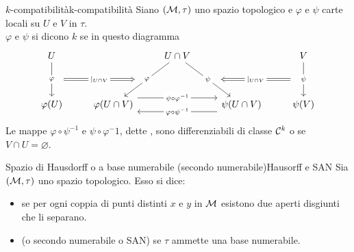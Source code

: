 \documentclass[annatarbolditalic, openany]{book}
\begin{document}
\begin{definition}{$k$-compatibilità}{k-compatibilità}
    Siano $(\mathcal{M},\tau)$ uno spazio topologico e $\varphi$ e $\psi$ carte locali su $U$ e $V$ in $\tau$.\\
    $\varphi$ e $\psi$ si dicono $k$ se in questo diagramma
    \[\begin{tikzcd}
	    U && {U\cap V} && V \\
	    \\
	    {\varphi(U)} & {\varphi(U \cap V)} && {\psi(U\cap V)} & {\psi(V)}
	    \arrow[""{name=0, anchor=center, inner sep=0}, "\varphi"{description}, from=1-1, to=3-1]
	    \arrow[""{name=1, anchor=center, inner sep=0}, "\varphi"{description}, from=1-3, to=3-2]
	    \arrow[""{name=2, anchor=center, inner sep=0}, "\psi"{description}, from=1-3, to=3-4]
	    \arrow[""{name=3, anchor=center, inner sep=0}, "\psi"{description}, from=1-5, to=3-5]
	    \arrow["{\psi \circ \varphi^{-1}}"{description}, shift left=3, from=3-2, to=3-4]
	    \arrow["{\varphi\circ\psi^{-1}}"{description}, shift left=3, from=3-4, to=3-2]
	    \arrow["{|_{U\cap V}}"{description}, shorten <=12pt, shorten >=12pt, Rightarrow, from=0, to=1]
	    \arrow["{|_{U\cap V}}"{description}, shorten <=13pt, shorten >=13pt, Rightarrow, from=3, to=2]
    \end{tikzcd}\]
    Le mappe $\varphi \circ \psi^{-1}$ e $\psi \circ \varphi^-1$, dette , sono differenziabili di classe $\mathcal{C}^k$ o se $V \cap U = \varnothing$.
\end{definition}

\begin{definition}{Spazio di Hausdorff o a base numerabile (secondo numerabile)}{Hausorff e SAN}
    Sia $(\mathcal{M},\tau)$ uno spazio topologico. Esso si dice:\begin{itemize}
        \item {} se per ogni coppia di punti distinti $x$ e $y$ in $\mathcal{M}$ esistono due aperti disgiunti che li separano.
        \item {} (o secondo numerabile o SAN) se $\tau$ ammette una base numerabile.
    \end{itemize}
\end{definition}
\end{document}
